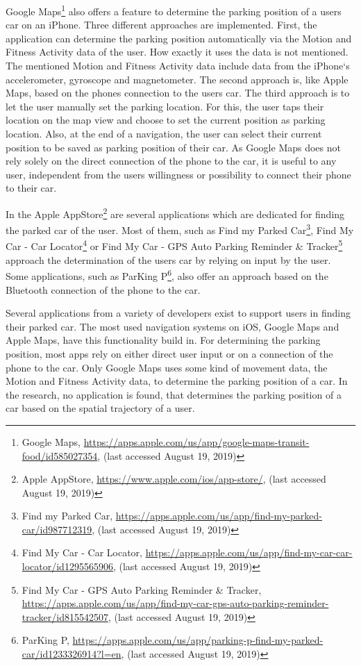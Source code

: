 Google Maps\footnote{Google Maps, \url{https://apps.apple.com/us/app/google-maps-transit-food/id585027354}, (last accessed August 19, 2019)} also offers a feature to determine the parking position of a users car on an iPhone. Three different approaches are implemented. First,  the application can determine the parking position automatically via the Motion and Fitness Activity data of the user. How exactly it uses the data is not mentioned. The mentioned Motion and Fitness Activity data include data from the iPhone`s accelerometer, gyroscope and magnetometer. The second approach is, like Apple Maps, based on the phones connection to the users car. The third approach is to let the user manually set the parking location. For this, the user taps their location on the map view and choose to set the current position as parking location. Also, at the end of a navigation, the user can select their current position to be saved as parking position of their car. As Google Maps does not rely solely on the direct connection of the phone to the car, it is useful to any user, independent from the users willingness or possibility to connect their phone to their car. \cite{google:maps:app:parkedcar}  \cite{apple:CoreMotion}

In the Apple AppStore\footnote{Apple AppStore, \url{https://www.apple.com/ios/app-store/}, (last accessed August 19, 2019)} are several applications which are dedicated for finding the parked car of the user. Most of them, such as Find my Parked Car\footnote{Find my Parked Car, \url{https://apps.apple.com/us/app/find-my-parked-car/id987712319}, (last accessed August 19, 2019)}, Find My Car - Car Locator\footnote{Find My Car - Car Locator, \url{https://apps.apple.com/us/app/find-my-car-car-locator/id1295565906}, (last accessed August 19, 2019)} or Find My Car - GPS Auto Parking Reminder \& Tracker\footnote{Find My Car - GPS Auto Parking Reminder \& Tracker, \url{https://apps.apple.com/us/app/find-my-car-gps-auto-parking-reminder-tracker/id815542507}, (last accessed August 19, 2019)} approach the determination of the users car by relying on input by the user. Some applications, such as ParKing P\footnote{ParKing P, \url{https://apps.apple.com/us/app/parking-p-find-my-parked-car/id1233326914?l=en}, (last accessed August 19, 2019)}, also offer an approach based on the Bluetooth connection of the phone to the car. 

Several applications from a variety of developers exist to support users in finding their parked car. The most used navigation systems on iOS, Google Maps and Apple Maps, have this functionality build in. For determining the parking position, most apps rely on either direct user input or on a connection of the phone to the car. Only Google Maps uses some kind of movement data, the Motion and Fitness Activity data, to determine the parking position of a car. In the research, no application is found, that determines the parking position of a car based on the spatial trajectory of a user.


